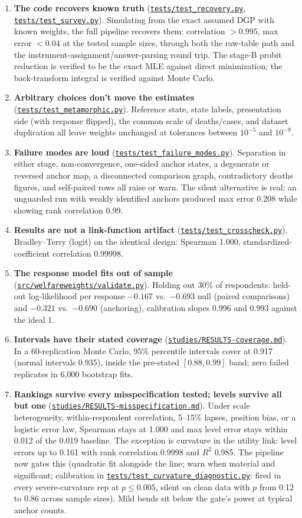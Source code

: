 \documentclass[11pt]{article}
\newcommand{\repo}{https://github.com/welfareweights/engine}
\newcommand{\src}[1]{\href{\repo/blob/main/#1}{\texttt{#1}}}
\begin{document}
\begin{enumerate}
\item \textbf{The code recovers known truth} (\src{tests/test\_recovery.py}, \src{tests/test\_survey.py}). Simulating from the exact assumed DGP with known weights, the full pipeline recovers them: correlation $>0.995$, max error $<0.04$ at the tested sample sizes, through both the raw-table path and the instrument-assignment/answer-parsing round trip. The stage-B probit reduction is verified to be the exact MLE against direct minimization; the back-transform integral is verified against Monte Carlo.
\item \textbf{Arbitrary choices don't move the estimates} (\src{tests/test\_metamorphic.py}). Reference state, state labels, presentation side (with response flipped), the common scale of deaths/cases, and dataset duplication all leave weights unchanged at tolerances between $10^{-5}$ and $10^{-9}$.
\item \textbf{Failure modes are loud} (\src{tests/test\_failure\_modes.py}). Separation in either stage, non-convergence, one-sided anchor states, a degenerate or reversed anchor map, a disconnected comparison graph, contradictory deaths figures, and self-paired rows all raise or warn. The silent alternative is real: an unguarded run with weakly identified anchors produced max error 0.208 while showing rank correlation 0.99.
\item \textbf{Results are not a link-function artifact} (\src{tests/test\_crosscheck.py}). Bradley--Terry (logit) on the identical design: Spearman 1.000, standardized-coefficient correlation 0.99998.
\item \textbf{The response model fits out of sample} (\src{src/welfareweights/validate.py}). Holding out 30\% of respondents: held-out log-likelihood per response $-0.167$ vs.\ $-0.693$ null (paired comparisons) and $-0.321$ vs.\ $-0.690$ (anchoring), calibration slopes 0.996 and 0.993 against the ideal 1.
\item \textbf{Intervals have their stated coverage} (\src{studies/RESULTS-coverage.md}). In a 60-replication Monte Carlo, 95\% percentile intervals cover at 0.917 (normal intervals 0.935), inside the pre-stated $[0.88, 0.99]$ band; zero failed replicates in 6{,}000 bootstrap fits.
\item \textbf{Rankings survive every misspecification tested; levels survive all but one} (\src{studies/RESULTS-misspecification.md}). Under scale heterogeneity, within-respondent correlation, 5--15\% lapses, position bias, or a logistic error law, Spearman stays at 1.000 and max level error stays within 0.012 of the 0.019 baseline. The exception is curvature in the utility link: level errors up to 0.161 with rank correlation 0.9998 and $R^2$ 0.985. The pipeline now gates this (quadratic fit alongside the line; warn when material and significant; calibration in \src{tests/test\_curvature\_diagnostic.py}: fired in every severe-curvature rep at $p \le 0.005$, silent on clean data with $p$ from 0.12 to 0.86 across sample sizes). Mild bends sit below the gate's power at typical anchor counts.

\end{enumerate}
\end{document}
